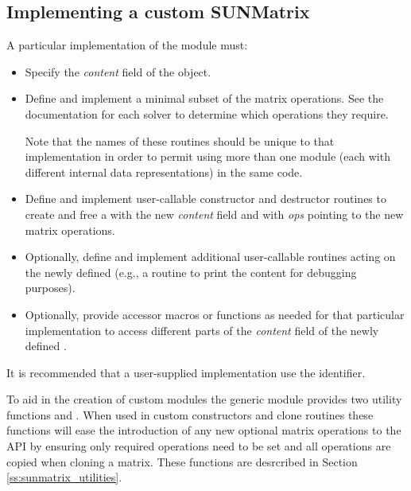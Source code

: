\subsection{Implementing a custom SUNMatrix}\label{ss:sunmatrix_custom}

A particular implementation of the {\sunmatrix} module must:
\begin{itemize}
\item Specify the {\em content} field of the  object.
\item Define and implement a minimal subset of the matrix operations.
  See the documentation for each {\sundials} solver to determine which
  {\sunmatrix} operations they require.

  Note that the names of these routines should be unique to that
  implementation in order to permit using more than one {\sunmatrix}
  module (each with different  internal data
  representations) in the same code.
\item Define and implement user-callable constructor and destructor
  routines to create and free a  with
  the new {\em content} field and with {\em ops} pointing to the
  new matrix operations.
\item Optionally, define and implement additional user-callable routines
  acting on the newly defined  (e.g., a routine to print
  the content for debugging purposes).
\item Optionally, provide accessor macros or functions as needed for
  that particular implementation to access different parts
  of the {\em content} field of the newly defined .
\end{itemize}

It is recommended that a user-supplied {\sunmatrix} implementation use the
 identifier.

To aid in the creation of custom {\sunmatrix} modules the generic {\sunmatrix}
module provides two utility functions  and
. When used in custom {\sunmatrix} constructors and clone
routines these functions will ease the introduction of any new optional matrix
operations to the {\sunmatrix} API by ensuring only required operations need to
be set and all operations are copied when cloning a matrix. These functions
are desrcribed in Section \ref{ss:sunmatrix_utilities}.
